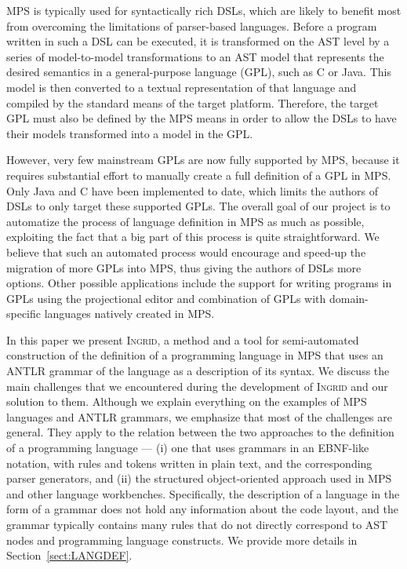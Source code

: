 MPS is typically used for syntactically rich DSLs, which are likely to benefit most from overcoming the limitations of parser-based languages.
Before a program written in such a DSL can be executed, it is transformed on the AST level by a series of model-to-model transformations to an AST model that represents the desired semantics in a general-purpose language (GPL), such as C or Java.
This model is then converted to a textual representation of that language and compiled by the standard means of the target platform.
Therefore, the target GPL must also be defined by the MPS means in order to allow the DSLs to have their models transformed into a model in the GPL.

However, very few mainstream GPLs are now fully supported by MPS, because it requires substantial effort to manually create a full definition of a GPL in MPS.
Only Java and C have been implemented to date, which limits the authors of DSLs to only target these supported GPLs.
The overall goal of our project is to automatize the process of language definition in MPS as much as possible, exploiting the fact that a big part of this process is quite straightforward.
We believe that such an automated process would encourage and speed-up the migration of more GPLs into MPS, thus giving the authors of DSLs more options.
Other possible applications include the support for writing programs in GPLs using the projectional editor and combination of GPLs with domain-specific languages natively created in MPS.

In this paper we present \textsc{Ingrid}, a method and a tool for semi-automated construction of the definition of a programming language in MPS that uses an ANTLR grammar of the language as a description of its syntax.
We discuss the main challenges that we encountered during the development of \textsc{Ingrid} and our solution to them.
 Although we explain everything on the examples of MPS languages and ANTLR grammars, we emphasize that most of the challenges are general. 
They apply to the relation between the two approaches to the definition of a programming language --- (i) one that uses grammars in an EBNF-like notation, with rules and tokens written in plain text, and the corresponding parser generators, and (ii) the structured object-oriented approach used in MPS and other language workbenches.
Specifically, the description of a language in the form of a grammar does not hold any information about the code layout, and the grammar typically contains many rules that do not directly correspond to AST nodes and programming language constructs.
We provide more details in Section~\ref{sect:LANGDEF}.

